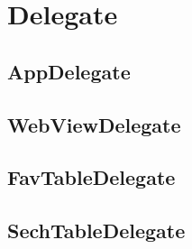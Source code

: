 
\section{Delegate}

\subsection{AppDelegate}
\subsection{WebViewDelegate}
\subsection{FavTableDelegate}
\subsection{SechTableDelegate}

